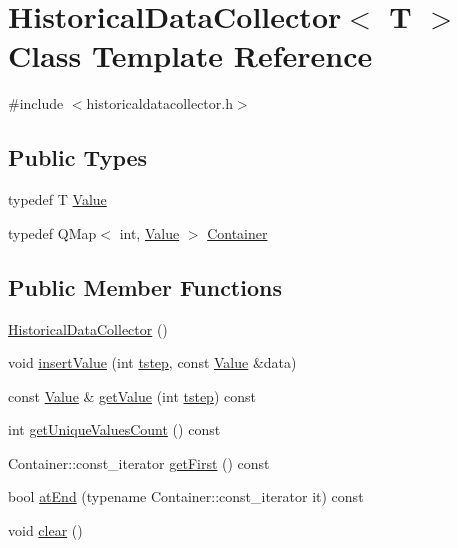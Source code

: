 \hypertarget{class_historical_data_collector}{}\section{Historical\+Data\+Collector$<$ T $>$ Class Template Reference}
\label{class_historical_data_collector}


{\ttfamily \#include $<$historicaldatacollector.\+h$>$}

\subsection*{Public Types}
\begin{DoxyCompactItemize}
\item 
typedef T \mbox{\hyperlink{class_historical_data_collector_a8b64738808b9cea9f590c86b2685c944}{Value}}
\item 
typedef Q\+Map$<$ int, \mbox{\hyperlink{class_historical_data_collector_a8b64738808b9cea9f590c86b2685c944}{Value}} $>$ \mbox{\hyperlink{class_historical_data_collector_ab9dd1d27498b0728df0f5c0f2c9c873f}{Container}}
\end{DoxyCompactItemize}
\subsection*{Public Member Functions}
\begin{DoxyCompactItemize}
\item 
\mbox{\hyperlink{class_historical_data_collector_a195386607b9d0cd494db9a44bcc74ff6}{Historical\+Data\+Collector}} ()
\item 
void \mbox{\hyperlink{class_historical_data_collector_a8d622665dcac616619fc4a47a34bd603}{insert\+Value}} (int \mbox{\hyperlink{thread__vessels_8cpp_a84bc73d278de929ec9974e1a95d9b23a}{tstep}}, const \mbox{\hyperlink{class_historical_data_collector_a8b64738808b9cea9f590c86b2685c944}{Value}} \&data)
\item 
const \mbox{\hyperlink{class_historical_data_collector_a8b64738808b9cea9f590c86b2685c944}{Value}} \& \mbox{\hyperlink{class_historical_data_collector_a97c5feae3dc9b4280dfb108be59ab467}{get\+Value}} (int \mbox{\hyperlink{thread__vessels_8cpp_a84bc73d278de929ec9974e1a95d9b23a}{tstep}}) const
\item 
int \mbox{\hyperlink{class_historical_data_collector_a954e9ae66cc8086ebd0647197aa027df}{get\+Unique\+Values\+Count}} () const
\item 
Container\+::const\+\_\+iterator \mbox{\hyperlink{class_historical_data_collector_accb6df0b42b0e9bebeba1c1d0face835}{get\+First}} () const
\item 
bool \mbox{\hyperlink{class_historical_data_collector_afe29d009cdbb84ed48546bed52989d87}{at\+End}} (typename Container\+::const\+\_\+iterator it) const
\item 
void \mbox{\hyperlink{class_historical_data_collector_aea428ce933d1542b899f03668940fb04}{clear}} ()
\end{DoxyCompactItemize}
